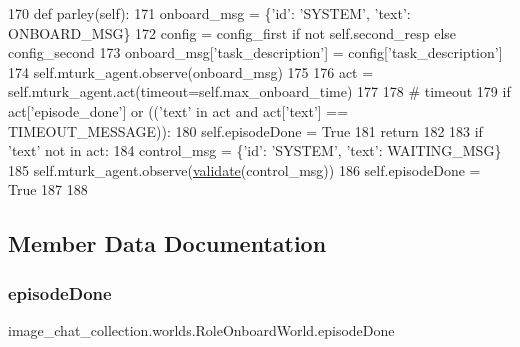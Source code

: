 \begin{DoxyCode}
170     \textcolor{keyword}{def }parley(self):
171         onboard\_msg = \{\textcolor{stringliteral}{'id'}: \textcolor{stringliteral}{'SYSTEM'}, \textcolor{stringliteral}{'text'}: ONBOARD\_MSG\}
172         config = config\_first \textcolor{keywordflow}{if} \textcolor{keywordflow}{not} self.second\_resp \textcolor{keywordflow}{else} config\_second
173         onboard\_msg[\textcolor{stringliteral}{'task\_description'}] = config[\textcolor{stringliteral}{'task\_description'}]
174         self.mturk\_agent.observe(onboard\_msg)
175 
176         act = self.mturk\_agent.act(timeout=self.max\_onboard\_time)
177 
178         \textcolor{comment}{# timeout}
179         \textcolor{keywordflow}{if} act[\textcolor{stringliteral}{'episode\_done'}] \textcolor{keywordflow}{or} ((\textcolor{stringliteral}{'text'} \textcolor{keywordflow}{in} act \textcolor{keywordflow}{and} act[\textcolor{stringliteral}{'text'}] == TIMEOUT\_MESSAGE)):
180             self.episodeDone = \textcolor{keyword}{True}
181             \textcolor{keywordflow}{return}
182 
183         \textcolor{keywordflow}{if} \textcolor{stringliteral}{'text'} \textcolor{keywordflow}{not} \textcolor{keywordflow}{in} act:
184             control\_msg = \{\textcolor{stringliteral}{'id'}: \textcolor{stringliteral}{'SYSTEM'}, \textcolor{stringliteral}{'text'}: WAITING\_MSG\}
185             self.mturk\_agent.observe(\hyperlink{namespaceparlai_1_1core_1_1worlds_afc3fad603b7bce41dbdc9cdc04a9c794}{validate}(control\_msg))
186             self.episodeDone = \textcolor{keyword}{True}
187 
188 
\end{DoxyCode}


\subsection{Member Data Documentation}
\mbox{\label{classimage__chat__collection_1_1worlds_1_1RoleOnboardWorld_a5f75149b8c759e83c23b1e39ed2d5dbb}} 
\subsubsection{\texorpdfstring{episode\+Done}{episodeDone}}
{\footnotesize\ttfamily image\+\_\+chat\+\_\+collection.\+worlds.\+Role\+Onboard\+World.\+episode\+Done}



